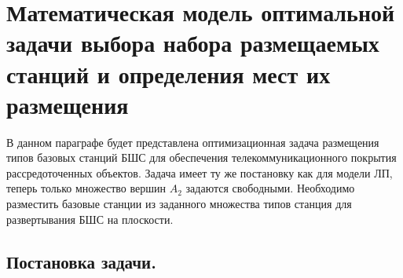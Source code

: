 








\section{Математическая модель оптимальной задачи выбора набора размещаемых станций и определения мест их размещения}

В данном параграфе будет представлена оптимизационная задача размещения типов базовых станций БШС для обеспечения телекоммуникационного покрытия рассредоточенных объектов. Задача имеет ту же постановку как для модели ЛП, теперь  только множество вершин $A_2$ задаются свободными. Необходимо разместить базовые станции из заданного множества типов станция для развертывания БШС на плоскости.

\subsection{Постановка задачи.}

